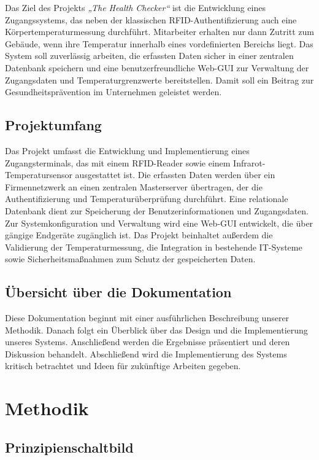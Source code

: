 Das Ziel des Projekts \textit{„The Health Checker“} ist die Entwicklung eines Zugangssystems, das neben der klassischen RFID-Authentifizierung auch eine Körpertemperaturmessung durchführt. Mitarbeiter erhalten nur dann Zutritt zum Gebäude, wenn ihre Temperatur innerhalb eines vordefinierten Bereichs liegt. Das System soll zuverlässig arbeiten, die erfassten Daten sicher in einer zentralen Datenbank speichern und eine benutzerfreundliche Web-GUI zur Verwaltung der Zugangsdaten und Temperaturgrenzwerte bereitstellen. Damit soll ein Beitrag zur Gesundheitsprävention im Unternehmen geleistet werden.

\subsection{Projektumfang}

Das Projekt umfasst die Entwicklung und Implementierung eines Zugangsterminals, das mit einem RFID-Reader sowie einem Infrarot-Temperatursensor ausgestattet ist. Die erfassten Daten werden über ein Firmennetzwerk an einen zentralen Masterserver übertragen, der die Authentifizierung und Temperaturüberprüfung durchführt. Eine relationale Datenbank dient zur Speicherung der Benutzerinformationen und Zugangsdaten. Zur Systemkonfiguration und Verwaltung wird eine Web-GUI entwickelt, die über gängige Endgeräte zugänglich ist. Das Projekt beinhaltet außerdem die Validierung der Temperaturmessung, die Integration in bestehende IT-Systeme sowie Sicherheitsmaßnahmen zum Schutz der gespeicherten Daten.

\subsection{Übersicht über die Dokumentation}

Diese Dokumentation beginnt mit einer ausführlichen Beschreibung unserer Methodik. Danach folgt ein Überblick über das Design und die Implementierung unseres Systems. Anschließend werden die Ergebnisse präsentiert und deren Diskussion behandelt. Abschließend wird die Implementierung des Systems kritisch betrachtet und Ideen für zukünftige Arbeiten gegeben.

\section{Methodik}\label{sec:methodik}



\subsection{Prinzipienschaltbild}\label{subsec:prinzipienschaltbild}

